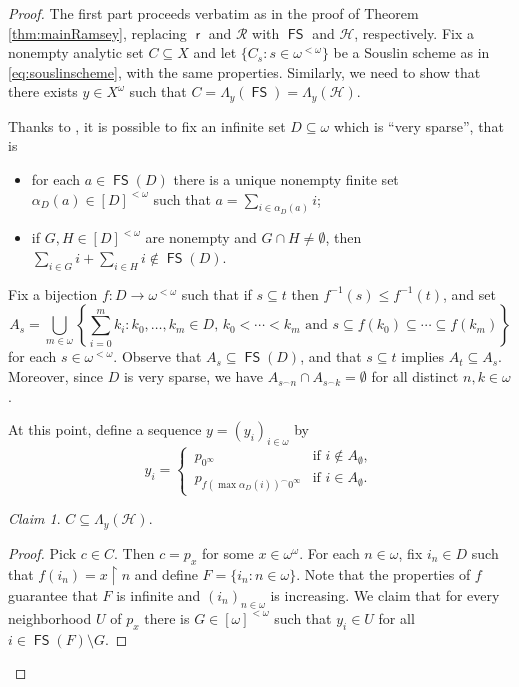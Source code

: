 \documentclass{amsart}
\theoremstyle{plain}
\theoremstyle{definition}
\theoremstyle{remark}
\newtheorem{claim}{Claim}
\DeclareMathOperator{\FS}{\mathsf{FS}}
\DeclareMathOperator{\rr}{\mathsf{r}}
\begin{document}
\begin{proof}
The first part proceeds verbatim as in the proof of Theorem \ref{thm:mainRamsey}, replacing $\rr$ and $\mathcal{R}$ with $\FS$ and $\mathcal{H}$, respectively. Fix a nonempty analytic set $C\subseteq X$ and let $\{C_s: s \in \omega^{<\omega}\}$ be a Souslin scheme as in \eqref{eq:souslinscheme}, with the same properties. Similarly, we need to show that there exists $y \in X^\omega$ such that $C=\Lambda_y(\FS)=\Lambda_y(\mathcal{H})$. 

Thanks to \cite[Lemma 2.2]{MR4356195}, it is possible to fix an infinite set $D\subseteq \omega$ which is ``very sparse'', that is
\begin{itemize}
    \item [(a)] for each $a\in\FS(D)$ there is a unique nonempty finite set $\alpha_D(a)\in[D]^{<\omega}$ such that $a=\sum_{i\in \alpha_D(a)}i$;
    \item [(b)] if $G,H\in [D]^{<\omega}$ are nonempty and $G\cap H\neq\emptyset$, then $\sum_{i\in G}i+\sum_{i\in H}i\notin\FS(D)$.
\end{itemize}
Fix a bijection $f:D\to\omega^{<\omega}$ such that if $s\subseteq t$ then $f^{-1}(s)\leq f^{-1}(t)$, and set 
\begin{equation*}
A_s=\bigcup_{m \in \omega}\left\{\sum_{i=0}^m k_i: 
k_0,\ldots,k_m \in D, \, k_0<\cdots<k_m \text{ and }s\subseteq f(k_0)\subseteq \cdots \subseteq f(k_{m})\right\}
\end{equation*}
for each $s\in\omega^{<\omega}$. 
Observe that $A_s\subseteq \FS(D)$, and that  $s\subseteq t$ implies $A_t\subseteq A_s$. Moreover, since $D$ is very sparse, we have $A_{s^\frown n}\cap A_{s^\frown k}=\emptyset$ for all distinct $n,k \in \omega$.

At this point, define a sequence $y=(y_{i})_{i\in\omega}$ by 
\begin{equation*}
y_{i}=\begin{cases}
    \,p_{0^\infty} &\text{if }i\notin A_\emptyset,\\
    \,p_{f(\max \alpha_D(i))^\frown 0^\infty} &\text{if }i\in A_\emptyset.
\end{cases}
\end{equation*}

\setcounter{claim}{0}
\begin{claim}\label{claim:inclusionB1}
    $C\subseteq\Lambda_y(\mathcal{H})$.
\end{claim}

\begin{proof}
    Pick $c\in C$. Then $c=p_x$ for some $x\in\omega^\omega$. For each $n\in\omega$,  fix $i_n\in D$ such that  $f(i_n)=x\restriction n$ and define $F=\{i_n:n\in\omega\}$. Note that the properties of $f$ guarantee that $F$ is infinite and $(i_n)_{n\in\omega}$ is increasing. 
    We claim that for every neighborhood $U$ of $p_x$ there is $G\in  
     [\omega]^{<\omega}$ such that $y_{i}\in U$ for all $i\in \FS(F)\setminus G$. 


\end{proof}
\end{proof}
\end{document}
